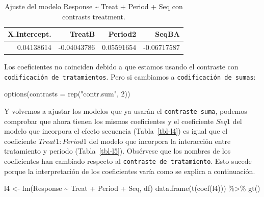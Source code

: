 \documentclass[
  12pt,
  a4paper,
  extrafontsizes,
  onecolumn,
  openright]{memoir}
\newenvironment{Shaded}{\begin{snugshade}}{\end{snugshade}}
\newcommand{\AttributeTok}[1]{\textcolor[rgb]{0.40,0.45,0.13}{#1}}
\newcommand{\DecValTok}[1]{\textcolor[rgb]{0.68,0.00,0.00}{#1}}
\newcommand{\FunctionTok}[1]{\textcolor[rgb]{0.28,0.35,0.67}{#1}}
\newcommand{\NormalTok}[1]{\textcolor[rgb]{0.00,0.23,0.31}{#1}}
\newcommand{\OtherTok}[1]{\textcolor[rgb]{0.00,0.23,0.31}{#1}}
\newcommand{\SpecialCharTok}[1]{\textcolor[rgb]{0.37,0.37,0.37}{#1}}
\newcommand{\StringTok}[1]{\textcolor[rgb]{0.13,0.47,0.30}{#1}}
\begin{document}
\hypertarget{tbl-l3}{}
\begin{longtable}{rrrr}
\caption{\label{tbl-l3}Ajuste del modelo Response \textasciitilde{} Treat + Period + Seq con
contrasts treatment. }\tabularnewline

\toprule
X.Intercept. & TreatB & Period2 & SeqBA \\ 
\midrule
0.04138614 & -0.04043786 & 0.05591654 & -0.06717587 \\ 
\bottomrule
\end{longtable}

\normalsize

Los coeficientes no coinciden debido a que estamos usando el contraste
con \texttt{codificación\ de\ tratamientos}. Pero si cambiamos a
\texttt{codificación\ de\ sumas}:

\scriptsize

\begin{Shaded}
\begin{Highlighting}[]
\FunctionTok{options}\NormalTok{(}\AttributeTok{contrasts =} \FunctionTok{rep}\NormalTok{(}\StringTok{"contr.sum"}\NormalTok{, }\DecValTok{2}\NormalTok{))}
\end{Highlighting}
\end{Shaded}

\normalsize

Y volvemos a ajustar los modelos que ya usarán el
\texttt{contraste\ suma}, podemos comprobar que ahora tienen los mismos
coeficientes y el coeficiente \(Seq1\) del modelo que incorpora el
efecto secuencia (Tabla~\ref{tbl-l4}) es igual que el coeficiente
\(Treat1:Period1\) del modelo que incorpora la interacción entre
tratamiento y periodo (Tabla~\ref{tbl-l5}). Obsérvese que los nombres de
los coeficientes han cambiado respecto al
\texttt{contraste\ de\ tratamiento}. Esto sucede porque la
interpretación de los coeficientes varía como se explica a continuación.

\scriptsize

\begin{Shaded}
\begin{Highlighting}[]
\NormalTok{l4 }\OtherTok{\textless{}{-}} \FunctionTok{lm}\NormalTok{(Response }\SpecialCharTok{\textasciitilde{}}\NormalTok{ Treat }\SpecialCharTok{+}\NormalTok{ Period }\SpecialCharTok{+}\NormalTok{ Seq, df)}
\FunctionTok{data.frame}\NormalTok{(}\FunctionTok{t}\NormalTok{(}\FunctionTok{coef}\NormalTok{(l4))) }\SpecialCharTok{\%\textgreater{}\%} \FunctionTok{gt}\NormalTok{()}
\end{Highlighting}
\end{Shaded}
\end{document}
